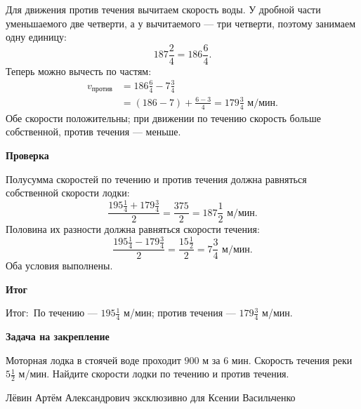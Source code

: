 \documentclass[12pt,a4paper]{article}
\newcommand{\outcome}{\textcolor{teal!60!black}{Итог:}}
\newcommand{\subpart}[1]{\par\medskip\textbf{#1}\par\nopagebreak[2]}
\begin{document}
Для движения против течения вычитаем скорость воды. У дробной части уменьшаемого две четверти, а у вычитаемого --- три четверти, поэтому занимаем одну единицу:
\[
187\frac24=186\frac64.
\]
Теперь можно вычесть по частям:
\[
\begin{aligned}
v_{\text{против}}&=186\frac64-7\frac34\\
&=(186-7)+\frac{6-3}{4}
=179\frac34\text{ м/мин}.
\end{aligned}
\]
Обе скорости положительны; при движении по течению скорость больше собственной, против течения --- меньше.
\subpart{Проверка}
Полусумма скоростей по течению и против течения должна равняться собственной скорости лодки:
\[
\frac{195\frac14+179\frac34}{2}
=\frac{375}{2}=187\frac12\text{ м/мин}.
\]
Половина их разности должна равняться скорости течения:
\[
\frac{195\frac14-179\frac34}{2}
=\frac{15\frac12}{2}=7\frac34\text{ м/мин}.
\]
Оба условия выполнены.
\subpart{Итог}
\outcome\ По течению --- $195\frac14$ м/мин; против течения --- $179\frac34$ м/мин.
\subpart{Задача на закрепление}
Моторная лодка в стоячей воде проходит $900$ м за $6$ мин. Скорость течения реки $5\frac12$ м/мин. Найдите скорости лодки по течению и против течения.

\vfill
\begin{center}\footnotesize Лёвин Артём Александрович эксклюзивно для Ксении Васильченко\end{center}
\end{document}
